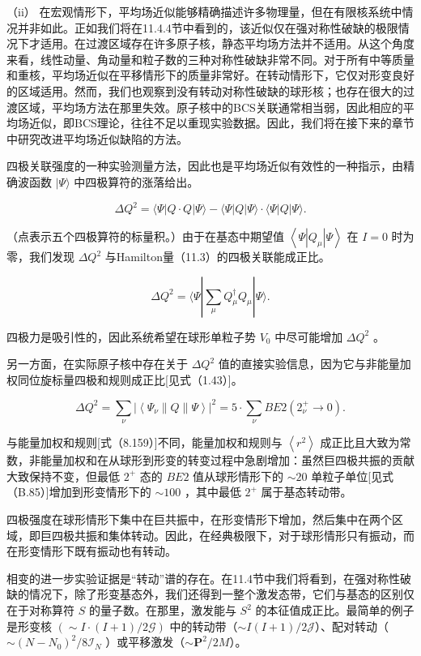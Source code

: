 （ii） 在宏观情形下，平均场近似能够精确描述许多物理量，但在有限核系统中情况并非如此。正如我们将在11.4.4节中看到的，该近似仅在强对称性破缺的极限情况下才适用。在过渡区域存在许多原子核，静态平均场方法并不适用。从这个角度来看，线性动量、角动量和粒子数的三种对称性破缺非常不同。对于所有中等质量和重核，平均场近似在平移情形下的质量非常好。在转动情形下，它仅对形变良好的区域适用。然而，我们也观察到没有转动对称性破缺的球形核；也存在很大的过渡区域，平均场方法在那里失效。原子核中的BCS关联通常相当弱，因此相应的平均场近似，即BCS理论，往往不足以重现实验数据。因此，我们将在接下来的章节中研究改进平均场近似缺陷的方法。

四极关联强度的一种实验测量方法，因此也是平均场近似有效性的一种指示，由精确波函数 $|\Psi\rangle$ 中四极算符的涨落给出。

\[
\Delta{Q}^{2}=\langle\Psi\left|{Q\cdot Q}\right|\Psi\rangle-\langle\Psi\left|Q\right|\Psi\rangle\cdot\langle\Psi\left|Q\right|\Psi\rangle.\tag{11.10}
\]

（点表示五个四极算符的标量积。）由于在基态中期望值 $\left\langle {\Psi\left|{Q}_{\mu}\right|\Psi}\right\rangle $
在 $I=0$ 时为零，我们发现 $\Delta{Q}^{2}$ 与Hamilton量（11.3）的四极关联能成正比。

\[
\Delta{Q}^{2}=\langle\Psi\left|{\mathop{\sum}\limits_{\mu}Q^{\dagger}_{\mu}{Q}_{\mu}}\right|\Psi\rangle.\tag{11.11}
\]

四极力是吸引性的，因此系统希望在球形单粒子势 ${V}_{0}$ 中尽可能增加 $\Delta{Q}^{2}$ 。

另一方面，在实际原子核中存在关于 $\Delta{Q}^{2}$ 值的直接实验信息，因为它与非能量加权同位旋标量四极和规则成正比{[}见式（1.43）{]}。

\[
\Delta{Q}^{2}=\mathop{\sum}\limits_{\nu}{\left|\left\langle {\Psi}_{\nu}\parallel Q\parallel\Psi\right\rangle \right|}^{2}=5\cdot\mathop{\sum}\limits_{\nu}{BE2}\left({{2}^{+}_{\nu}\rightarrow0}\right).\tag{11.12}
\]

与能量加权和规则{[}式（8.159）{]}不同，能量加权和规则与 $\left\langle {r}^{2}\right\rangle $
成正比且大致为常数，非能量加权和在从球形到形变的转变过程中急剧增加：虽然巨四极共振的贡献大致保持不变，但最低 ${2}^{+}$
态的 ${BE2}$ 值从球形情形下的 $\sim{20}$ 单粒子单位{[}见式（B.85）{]}增加到形变情形下的 $\sim{100}$
，其中最低 ${2}^{+}$ 属于基态转动带。

四极强度在球形情形下集中在巨共振中，在形变情形下增加，然后集中在两个区域，即巨四极共振和集体转动。因此，在经典极限下，对于球形情形只有振动，而在形变情形下既有振动也有转动。

相变的进一步实验证据是“转动”谱的存在。在11.4节中我们将看到，在强对称性破缺的情况下，除了形变基态外，我们还得到一整个激发态带，它们与基态的区别仅在于对称算符
$S$ 的量子数。在那里，激发能与 ${S}^{2}$ 的本征值成正比。最简单的例子是形变核 $\left({\sim I\cdot\left({I+1}\right)/2\mathcal{G}}\right)$
中的转动带（$\sim I(I+1)/2\mathcal{J}$）、配对转动（$\sim(N-N_{0})^{2}/8\mathcal{I}_{N}$
\cite{Sch71a,BB76}）或平移激发（$\sim\boldsymbol{P}^{2}/2M$）。

